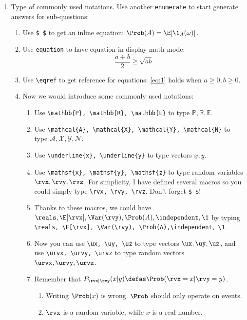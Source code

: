 \documentclass[a4paper]{article}
\begin{document}
\begin{enumerate}
  \setlength{\itemsep}{3\parskip}

  \item Type of commonly used notations. Use another \texttt{enumerate} to start generate answers for sub-questions:
    \begin{enumerate}
    \item Use \verb|$ $| to get an inline equation: $\Prob(A) = \E[\1_A(\omega)]$.
    \item Use \texttt{equation} to have equation in display math mode:
      \begin{equation}
        \frac{a + b}{2} \geq \sqrt{ab}
        \label{eq:1}
      \end{equation}
      
    \item Use \verb|\eqref| to get reference for equations: \eqref{eq:1} holds when $a\geq 0, b\geq 0$.
      
    \item Now we would introduce some commonly used notations:
      \begin{enumerate}
      \item Use \verb|\mathbb{P}, \mathbb{R}, \mathbb{E}| to type $\mathbb{P}, \mathbb{R}, \mathbb{E}$.
      \item Use \verb|\mathcal{A}, \mathcal{X}, \mathcal{Y}, \mathcal{N}| to type $\mathcal{A}, \mathcal{X}, \mathcal{Y}, \mathcal{N}$.
      \item Use \verb|\underline{x}, \underline{y}| to type vectors $\underline{x}, \underline{y}$.
      \item Use \verb|\mathsf{x}, \mathsf{y}, \mathsf{z}| to type random variables $\rvx, \rvy, \rvz$. For simplicity, I have defined several macros so you could simply type \verb|\rvx, \rvy, \rvz|. Don't forget \verb|$ $|!
      \item Thanks to these macros, we could have $\reals, \E[\rvx], \Var(\rvy), \Prob(A), \independent, \1$ by typing \verb|\reals, \E[\rvx], \Var(\rvy), \Prob(A),\independent,| \verb|\1|.
      \item Now you can use \verb|\ux, \uy, \uz| to type vectors $\ux, \uy, \uz$, and use \verb|\urvx, \urvy, \urvz| to type random vectors $\urvx, \urvy, \urvz$.   
      \item Remember that $P_{\rvx|\rvy}(x|y) \defas \Prob(\rvx = x|\rvy = y)$.
        \begin{enumerate}
        \item Writing $\Prob(x)$ is wrong. $\Prob$ should only operate on events.
        \item $\rvx$ is a random variable, while $x$ is a real number.
        \end{enumerate}
        

\end{enumerate}
\end{enumerate}
\end{enumerate}
\end{document}
